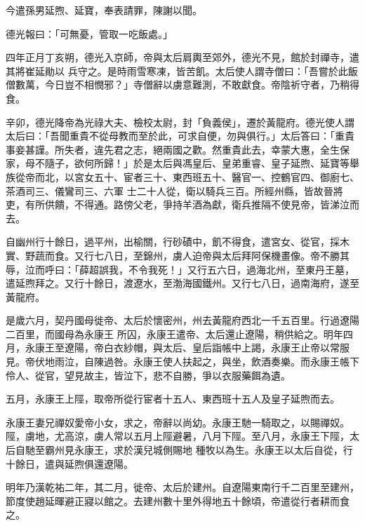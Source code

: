 \begin{pinyinscope}
 今遣孫男延煦、延寶，奉表請罪，陳謝以聞。



 德光報曰：「可無憂，管取一吃飯處。」



 四年正月丁亥朔，德光入京師，帝與太后肩輿至郊外，德光不見，館於封禪寺，遣其將崔延勛以
 兵守之。是時雨雪寒凍，皆苦飢。太后使人謂寺僧曰：「吾嘗於此飯僧數萬，今日豈不相憫邪？」寺僧辭以虜意難測，不敢獻食。帝陰祈守者，乃稍得食。



 辛卯，德光降帝為光祿大夫、檢校太尉，封「負義侯」，遷於黃龍府。德光使人謂太后曰：「吾聞重貴不從母教而至於此，可求自便，勿與俱行。」太后答曰：「重貴事妾甚謹。所失者，違先君之志，絕兩國之歡。然重貴此去，幸蒙大惠，全生保家，母不隨子，欲何所歸！」於是太后與馮皇后、皇弟重睿、皇子延煦、延寶等舉族從帝而北，以宮女五十、宦者三十、東西班五十、醫官一、控鶴官四、御廚七、茶酒司三、儀鸞司三、六軍
 士二十人從，衛以騎兵三百。所經州縣，皆故晉將吏，有所供饋，不得通。路傍父老，爭持羊酒為獻，衛兵推隔不使見帝，皆涕泣而去。



 自幽州行十餘日，過平州，出榆關，行砂磧中，飢不得食，遣宮女、從官，採木實、野蔬而食。又行七八日，至錦州，虜人迫帝與太后拜阿保機畫像。帝不勝其辱，泣而呼曰：「薛超誤我，不令我死！」又行五六日，過海北州，至東丹王墓，遣延煦拜之。又行十餘日，渡遼水，至渤海國鐵州。又行七八日，過南海府，遂至黃龍府。



 是歲六月，契丹國母徙帝、太后於懷密州，州去黃龍府西北一千五百里。行過遼陽二百里，而國母為永康王
 所囚，永康王遣帝、太后還止遼陽，稍供給之。明年四月，永康王至遼陽，帝白衣紗帽，與太后、皇后詣帳中上謁，永康王止帝以常服見。帝伏地雨泣，自陳過咎。永康王使人扶起之，與坐，飲酒奏樂。而永康王帳下伶人、從官，望見故主，皆泣下，悲不自勝，爭以衣服藥餌為遺。



 五月，永康王上陘，取帝所從行宦者十五人、東西班十五人及皇子延煦而去。



 永康王妻兄禪奴愛帝小女，求之，帝辭以尚幼。永康王馳一騎取之，以賜禪奴。陘，虜地，尤高涼，虜人常以五月上陘避暑，八月下陘。至八月，永康王下陘，太后自馳至霸州見永康王，求於漢兒城側賜地
 種牧以為生。永康王以太后自從，行十餘日，遣與延煦俱還遼陽。



 明年乃漢乾祐二年，其二月，徙帝、太后於建州。自遼陽東南行千二百里至建州，節度使趙延暉避正寢以館之。去建州數十里外得地五十餘頃，帝遣從行者耕而食之。




\end{pinyinscope}
